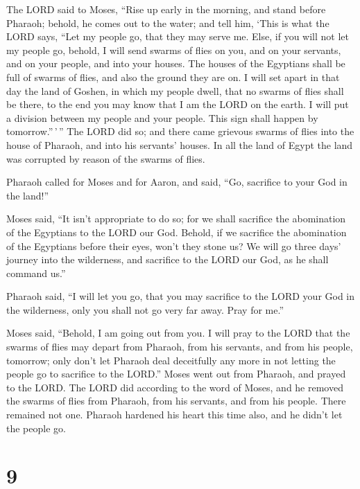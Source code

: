 The LORD said to Moses, ``Rise up early in the morning,
and stand before Pharaoh; behold, he comes out to the water; and tell
him, `This is what the LORD says, ``Let my people go, that they may
serve me.  Else, if you will not let my people go, behold,
I will send swarms of flies on you, and on your servants, and on your
people, and into your houses. The houses of the Egyptians shall be full
of swarms of flies, and also the ground they are on.  I
will set apart in that day the land of Goshen, in which my people dwell,
that no swarms of flies shall be there, to the end you may know that I
am the LORD on the earth.  I will put a division between my
people and your people. This sign shall happen by tomorrow.''\,'\,''
 The LORD did so; and there came grievous swarms of flies
into the house of Pharaoh, and into his servants' houses. In all the
land of Egypt the land was corrupted by reason of the swarms of flies.

 Pharaoh called for Moses and for Aaron, and said, ``Go,
sacrifice to your God in the land!''

 Moses said, ``It isn't appropriate to do so; for we shall
sacrifice the abomination of the Egyptians to the LORD our God. Behold,
if we sacrifice the abomination of the Egyptians before their eyes,
won't they stone us?  We will go three days' journey into
the wilderness, and sacrifice to the LORD our God, as he shall command
us.''

 Pharaoh said, ``I will let you go, that you may sacrifice
to the LORD your God in the wilderness, only you shall not go very far
away. Pray for me.''

 Moses said, ``Behold, I am going out from you. I will pray
to the LORD that the swarms of flies may depart from Pharaoh, from his
servants, and from his people, tomorrow; only don't let Pharaoh deal
deceitfully any more in not letting the people go to sacrifice to the
LORD.''  Moses went out from Pharaoh, and prayed to the
LORD.  The LORD did according to the word of Moses, and he
removed the swarms of flies from Pharaoh, from his servants, and from
his people. There remained not one.  Pharaoh hardened his
heart this time also, and he didn't let the people go.

\hypertarget{section-8}{%
\section{9}\label{section-8}}

